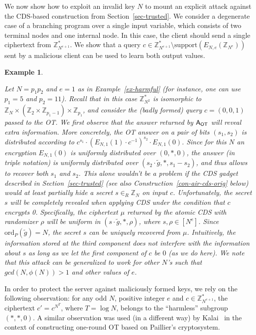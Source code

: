 \documentclass[11pt]{article}
\newtheorem{Example}[theorem]{Example}
\newenvironment{example}{\begin{Example}\begin{rm}}{\end{rm}\end{Example}}
\newcommand{\ansot}{{\sf A_{OT}}}
\newcommand{\encdj}{{E}_{N,e}}
\newcommand{\Z}{\mathbb{Z}}
\newcommand{\U}[1]{\mathbb{Z}_{#1}^*}
\newcommand\ot{\mbox{OT}\xspace}
\newcommand{\encr}[2]{E_{#1}(#2)}
\newcommand{\order}{{\mathrm{ord}}}
\newcommand{\support}{{\mathrm{support}}}
\begin{document}
We now show how to exploit an invalid key $N$ to mount an explicit
attack against the CDS-based construction from
Section~\ref{sec-trusted}.
We consider a degenerate case of a branching program over a single
input variable, which consists of two terminal nodes and one
internal node. In this case, the client should send a single
ciphertext from $\U{N^{e+1}}$. We show that a query
$c\in\U{N^{e+1}}\setminus\support(\encdj(\Z_{N^e}))$ sent by a
malicious client can be used to learn both output values.
\begin{example}
\label{ex-fullymal-attack} Let $N=p_1p_2$ and $e=1$ as in
Example~\ref{ex-harmful} (for instance, one can use $p_1=5$ and
$p_2=11$). Recall that in this case $\U{N^2}$ is isomorphic to
$\Z_N\times (\Z_2\times\Z_{p_1-1})\times \Z_{p_1}$, and consider
the (badly formed) query $c=(0,0,1)$ passed to the \ot. We first
observe that the answer returned by $\ansot$ will reveal extra
information. More concretely, the OT answer on a pair of bits
$(s_1,s_2)$ is distributed according to
$c^{s_1}\cdot(\encr{N,1}{1}\cdot c^{-1})^{s_2}\cdot \encr{N,1}{0}$.
Since for this $N$ an encryption $\encr{N,1}{0}$ is uniformly
distributed over $(0,*,0)$, the answer (in triple notation) is
uniformly distributed over $(s_2\cdot \tilde{g},*,s_1-s_2)$, and
thus allows to recover both $s_1$ and $s_2$. This alone wouldn't be
a problem if the CDS gadget described in Section~\ref{sec-trusted}
(see also Construction~\ref{con-air-cds-orig} below) would at least
partially hide a secret $s\in_R\Z_N$ on input $c$. Unfortunately,
the secret $s$ will be completely revealed when applying CDS under
the condition that $c$ encrypts 0. Specifically, the ciphertext
$\mu$ returned by the atomic CDS with randomizer $\rho$ will be
uniform in $(s\cdot \tilde{g},*,\rho)$, where $s,\rho\in[N^e]$.
Since $\order_P(\tilde{g})=N$,  the secret $s$ can be uniquely
recovered from $\mu$. Intuitively, the information stored at the
third component does not interfere with the information about $s$
as long as we let the first component of $c$ be $0$ (as we do
here). We note that this attack can be generalized to work for
other $N$'s such that $gcd(N,\phi(N))>1$ and other values of $e$.
\end{example}

In order to protect the server against maliciously formed keys, we
rely on the following observation: for any odd $N$, positive
integer $e$ and $c\in \U{N^{e+1}}$, the ciphertext $c'=c^{N^T}$,
where $T=\log N$, belongs to the ``harmless'' subgroup $(*,*,0)$. A
similar observation was used (in a different way) by
Kalai~\cite{T05} in the context of constructing one-round OT based
on Paillier's cryptosystem.
\end{document}

